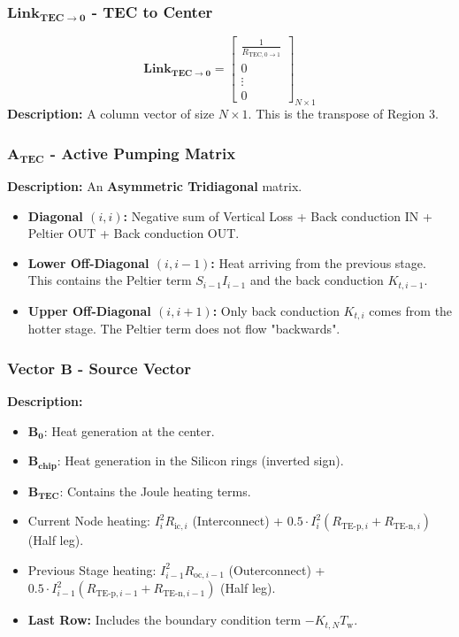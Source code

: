 \documentclass[10pt,a4paper,twocolumn]{article}
\begin{document}
\subsubsection{$\mathbf{Link_{TEC \to 0}}$ - TEC to Center}
$$ \mathbf{Link_{TEC \to 0}} = \begin{bmatrix} \frac{1}{R_{\text{TEC}, 0\to 1}} \\ 0 \\ \vdots \\ 0 \end{bmatrix}_{N \times 1} $$
\textbf{Description:} A column vector of size $N \times 1$. This is the transpose of Region 3.

\subsubsection{$\mathbf{A_{TEC}}$ - Active Pumping Matrix}
\textbf{Description:} An \textbf{Asymmetric Tridiagonal} matrix.
\begin{itemize}
	\item \textbf{Diagonal $(i,i)$:} Negative sum of Vertical Loss + Back conduction IN + Peltier OUT + Back conduction OUT.
	\item \textbf{Lower Off-Diagonal $(i, i-1)$:} Heat arriving from the previous stage. This contains the Peltier term $S_{i-1}I_{i-1}$ and the back conduction $K_{t,i-1}$.
	\item \textbf{Upper Off-Diagonal $(i, i+1)$:} Only back conduction $K_{t,i}$ comes from the hotter stage. The Peltier term does not flow "backwards".
\end{itemize}

\subsubsection{Vector $\mathbf{B}$ - Source Vector}

\textbf{Description:}
\begin{itemize}
	\item $\mathbf{B_{0}}$: Heat generation at the center.
	\item $\mathbf{B_{\text{chip}}}$: Heat generation in the Silicon rings (inverted sign).
	\item $\mathbf{B_{\text{TEC}}}$: Contains the Joule heating terms.
	\item Current Node heating: $I_i^2 R_{\text{ic},i}$ (Interconnect) + $0.5 \cdot I_i^2 (R_{\text{TE-p},i}+R_{\text{TE-n},i})$ (Half leg).
	\item Previous Stage heating: $I_{i-1}^2 R_{\text{oc},i-1}$ (Outerconnect) + $0.5 \cdot I_{i-1}^2 (R_{\text{TE-p},i-1}+R_{\text{TE-n},i-1})$ (Half leg).
	\item \textbf{Last Row:} Includes the boundary condition term $-K_{t,N} T_{\text{w}}$.
\end{itemize}
\end{document}
